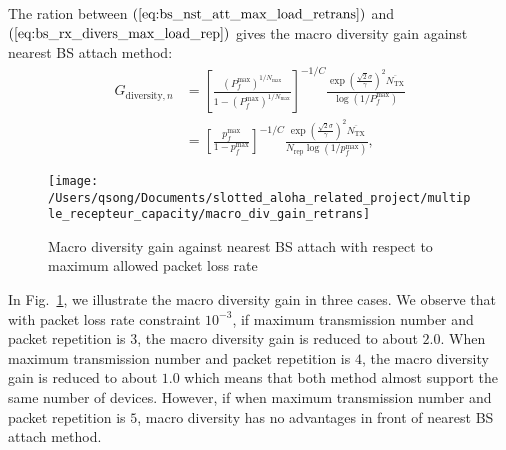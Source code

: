The ration between $(\ref{eq:bs_nst_att_max_load_retrans})$ and $(\ref{eq:bs_rx_divers_max_load_rep})$ gives the macro diversity gain against nearest BS attach method:
\begin{align}
\label{eq:macro-diversity-gain_with_retrans}
G_{\text{diversity},n} &= \left[ \frac{ \left( P_{f}^{\text{max}}\right) ^{1/N_{\text{max}}} }{1-(P_{f}^{\text{max}})^{1/N_{\text{max}}}}\right]  ^{-1/C}  \frac{\exp \left( \frac{\sqrt{2}\sigma}{\gamma}\right) ^2\overline{N_{\text{TX}}}}{ \log(1/P_{f}^{\text{max}})} \nonumber\\
&= \left[ \frac{ p_{f}^{\text{max}} }{1-p_{f}^{\text{max}}   }\right]  ^{-1/C}  \frac{\exp \left( \frac{\sqrt{2}\sigma}{\gamma}\right) ^2\overline{N_{\text{TX}}}}{ N_{\text{rep}}\log(1/p_{f}^{\text{max}})} ,
\end{align}

\begin{figure}
	\centering
	\texttt{[image: /Users/qsong/Documents/slotted\_aloha\_related\_project/multiple\_recepteur\_capacity/macro\_div\_gain\_retrans]}
	\caption{Macro diversity gain against nearest BS attach with respect to maximum allowed packet loss rate}
	\label{fig:macrodivgainretrans}
\end{figure}

In Fig.~\ref{fig:macrodivgainretrans}, we illustrate the macro diversity gain in three cases. We observe that with packet loss rate constraint $10^{-3}$, if maximum transmission number and packet repetition is $3$, the macro diversity gain is reduced to about $2.0$. When maximum transmission number and packet repetition is $4$, the macro diversity gain is reduced to about $1.0$ which means that both method almost support the same number of devices. However, if when maximum transmission number and packet repetition is $5$, macro diversity has no advantages in front of nearest BS attach method.

